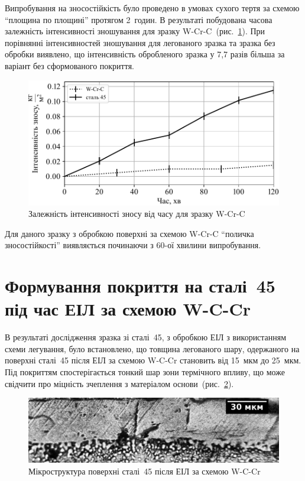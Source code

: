 \documentclass[a4paper,fontsize=14bp,ukrainian]{extreport}
\begin{document}
Випробування на зносостійкість було проведено в умовах сухого тертя за схемою ``площина по площині'' протягом 2~годин. В результаті побудована часова залежність інтенсивності зношування для зразку W-Cr-C~(рис.~\ref{fig:plt_wear_W-Cr-C}). При порівнянні інтенсивностей зношування для легованого зразка та зразка без обробки виявлено, що інтенсивність обробленого зразка у 7,7 разів більша за варіант без сформованого покриття.

\begin{figure}[H]
\centering
\includegraphics[]{plt_wear_W-Cr-C.pdf}
\caption{Залежність інтенсивності зносу від часу для зразку W-Cr-C}
\label{fig:plt_wear_W-Cr-C}
\end{figure}

Для даного зразку з обробкою поверхні за схемою W-Cr-C ``поличка зносостійкості'' виявляється починаючи з 60-ої хвилини випробування.

\section{Формування покриття на сталі~45 під час ЕІЛ за схемою W-C-Cr}

В результаті дослідження зразка зі сталі~45, з обробкою ЕІЛ з використанням схеми легування, було встановлено, що товщина легованого шару, одержаного на поверхні сталі~45 після ЕІЛ за схемою W-C-Cr становить від 15~мкм до 25~мкм. Під покриттям спостерігається тонкий шар зони термічного впливу, що може свідчити про міцність зчеплення з матеріалом основи~(рис.~\ref{fig:adapt_microstr_W-C-Cr}).

\enlargethispage{1\baselineskip}
\begin{figure}[H]
\centering
\includegraphics[width=\textwidth]{adapt_gray_microstr_W-C-Cr.jpg}
\caption{Мікроструктура поверхні сталі~45 після ЕІЛ за схемою W-C-Cr}
\label{fig:adapt_microstr_W-C-Cr}
\end{figure}
\end{document}
